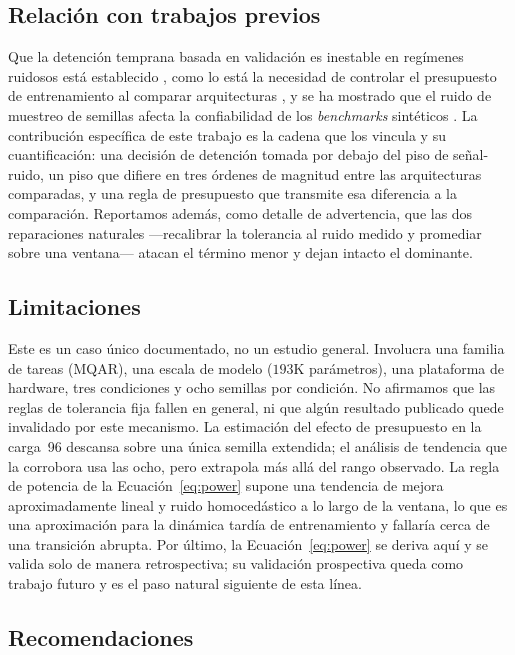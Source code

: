 \documentclass[jou,11pt,donotrepeattitle]{apa7}
\begin{document}
\subsection{Relaci\'on con trabajos previos}

Que la detenci\'on temprana basada en validaci\'on es inestable en reg\'imenes ruidosos est\'a
establecido \parencite{prechelt1998automatic}, como lo est\'a la necesidad de controlar el
presupuesto de entrenamiento al comparar arquitecturas \parencite{li2019budgeted}, y se ha
mostrado que el ruido de muestreo de semillas afecta la confiabilidad de los \emph{benchmarks}
sint\'eticos \parencite{chanin2026reliable}. La contribuci\'on espec\'ifica de este trabajo es la
cadena que los vincula y su cuantificaci\'on: una decisi\'on de detenci\'on tomada por debajo del
piso de se\~nal-ruido, un piso que difiere en tres \'ordenes de magnitud entre las arquitecturas
comparadas, y una regla de presupuesto que transmite esa diferencia a la comparaci\'on.
Reportamos adem\'as, como detalle de advertencia, que las dos reparaciones naturales ---recalibrar
la tolerancia al ruido medido y promediar sobre una ventana--- atacan el t\'ermino menor y dejan
intacto el dominante.

\subsection{Limitaciones}

Este es un caso \'unico documentado, no un estudio general. Involucra una familia de tareas
(MQAR), una escala de modelo ($193$K par\'ametros), una plataforma de hardware, tres condiciones
y ocho semillas por condici\'on. No afirmamos que las reglas de tolerancia fija fallen en
general, ni que alg\'un resultado publicado quede invalidado por este mecanismo. La estimaci\'on
del efecto de presupuesto en la carga~96 descansa sobre una \'unica semilla extendida; el
an\'alisis de tendencia que la corrobora usa las ocho, pero extrapola m\'as all\'a del rango
observado. La regla de potencia de la Ecuaci\'on~\ref{eq:power} supone una tendencia de mejora
aproximadamente lineal y ruido homoced\'astico a lo largo de la ventana, lo que es una
aproximaci\'on para la din\'amica tard\'ia de entrenamiento y fallar\'ia cerca de una transici\'on
abrupta. Por \'ultimo, la Ecuaci\'on~\ref{eq:power} se deriva aqu\'i y se valida solo de manera
retrospectiva; su validaci\'on prospectiva queda como trabajo futuro y es el paso natural
siguiente de esta l\'inea.

\subsection{Recomendaciones}
\end{document}
